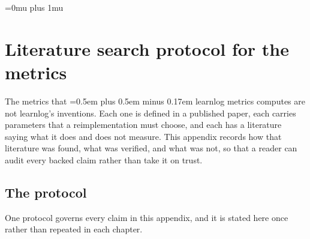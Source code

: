
\providecommand{\qy}[1]{{\ttfamily\spaceskip=0.5em plus 0.5em minus 0.17em
  \hyphenpenalty=10000 #1}}

\makeatletter
\def\do@url@hyp{\do\-}
\makeatother
\Urlmuskip=0mu plus 1mu\relax

\chapter{Literature search protocol for the metrics}
\label{app:metrics-protocol}

The metrics that \qy{learnlog metrics} computes are not learnlog's
inventions.  Each one is defined in a published paper, each carries
parameters that a reimplementation must choose, and each has a literature
saying what it does and does not measure.  This appendix records how that
literature was found, what was verified, and what was not, so that a reader
can audit every backed claim rather than take it on trust.

\section{The protocol}
\label{app:protocol:method}

One protocol governs every claim in this appendix, and it is stated here
once rather than repeated in each chapter.

